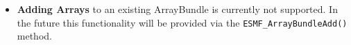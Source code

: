 
\begin{itemize}

\item {\bf Adding Arrays} to an existing ArrayBundle is currently not supported. In the future this functionality will be provided via the
{\tt ESMF\_ArrayBundleAdd()} method.

\end{itemize}
